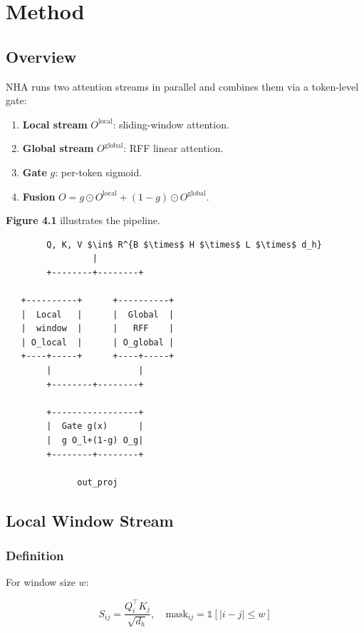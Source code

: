 
\section{Method}

\subsection{Overview}

NHA runs two attention streams in parallel and combines them via a token-level 
gate:

\begin{enumerate}
\item \textbf{Local stream} $O^\text{local}$: sliding-window attention.
\item \textbf{Global stream} $O^\text{global}$: RFF linear attention.
\item \textbf{Gate} $g$: per-token sigmoid.
\item \textbf{Fusion} $O = g \odot O^\text{local} + (1 - g) \odot O^\text{global}$.

\end{enumerate}
\textbf{Figure 4.1} illustrates the pipeline.

\begin{lstlisting}
        Q, K, V $\in$ R^{B $\times$ H $\times$ L $\times$ d_h}
                 |
        +--------+--------+
                           
   +----------+      +----------+
   |  Local   |      |  Global  |
   |  window  |      |   RFF    |
   | O_local  |      | O_global |
   +----+-----+      +----+-----+
        |                 |
        +--------+--------+
                  
        +-----------------+
        |  Gate g(x)      |
        |  g O_l+(1-g) O_g|
        +--------+--------+
                  
              out_proj
\end{lstlisting}

\subsection{Local Window Stream}

\subsubsection{Definition}

For window size $w$:

\[
S_{ij} = \frac{Q_i^\top K_j}{\sqrt{d_h}}, \quad
\text{mask}_{ij} = \mathbb{1}[|i - j| \leq w]
\tag{4.1}
\]


